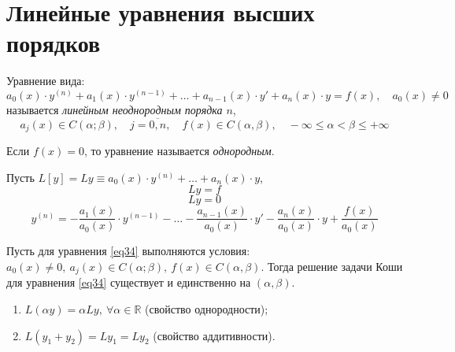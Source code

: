 \section{Линейные уравнения высших порядков}

\begin{definition}
    Уравнение вида:
    \begin{equation}\label{eq31}
        a_0(x) \cdot y^{(n)} + a_1(x) \cdot y^{(n-1)} + \ldots + a_{n-1}(x)\cdot y' + a_n(x) \cdot y = f(x), \quad a_0(x) \ne 0
    \end{equation}
    называется \emph{линейным неоднородным порядка $n$},
    \[
        a_j(x) \in C(\alpha;\beta), \quad j = \overline{0,n}, \quad f(x) \in C(\alpha, \beta), \quad -\infty \leqslant \alpha < \beta \leqslant + \infty
    \]

    Если $f(x) = 0$, то уравнение называется \emph{однородным}.

    Пусть $L[y] = Ly \equiv a_0 (x) \cdot y^{(n)} + \ldots + a_n(x) \cdot y$,
    \begin{equation}\label{eq32}
        Ly = f
    \end{equation}
    \begin{equation}\label{eq33}
        Ly = 0
    \end{equation}
    \begin{equation}\label{eq34}
        y^{(n)} = - \frac{a_1(x)}{a_0(x)} \cdot y^{(n-1)} - \ldots - \frac{a_{n-1}(x)}{a_0(x)} \cdot y' - \frac{a_n(x)}{a_0(x)} \cdot y + \frac{f(x)}{a_0(x)}
    \end{equation}
\end{definition}

\begin{theorem}
    Пусть для уравнения \ref{eq34} выполняются условия: $a_0(x) \ne 0, \ a_j(x) \in C(\alpha;\beta), \ f(x) \in C(\alpha, \beta)$. Тогда решение задачи Коши для уравнения \ref{eq34} существует и единственно на $(\alpha, \beta)$.
\end{theorem}

\begin{note}\leavevmode
    \begin{enumerate}
        \item $L(\alpha y) = \alpha Ly, \ \forall \alpha \in \mathbb{R}$ (свойство однородности);
        \item $L(y_1 + y_2) = Ly_1 = Ly_2$ (свойство аддитивности).
    \end{enumerate}
\end{note}

